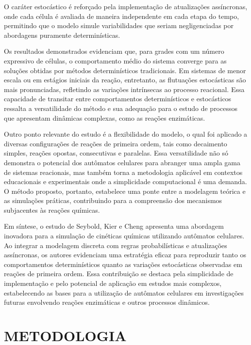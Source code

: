 \documentclass[12pt,oneside]{report}
\begin{document}
O caráter estocástico é reforçado pela implementação de atualizações assíncronas, onde cada célula é avaliada de maneira independente em cada etapa do tempo, permitindo que o modelo simule variabilidades que seriam negligenciadas por abordagens puramente determinísticas.

Os resultados demonstrados evidenciam que, para grades com um número expressivo de células, o comportamento médio do sistema converge para as soluções obtidas por métodos determinísticos tradicionais. Em sistemas de menor escala ou em estágios iniciais da reação, entretanto, as flutuações estocásticas são mais pronunciadas, refletindo as variações intrínsecas ao processo reacional. Essa capacidade de transitar entre comportamentos determinísticos e estocásticos ressalta a versatilidade do método e sua adequação para o estudo de processos que apresentam dinâmicas complexas, como as reações enzimáticas.

Outro ponto relevante do estudo é a flexibilidade do modelo, o qual foi aplicado a diversas configurações de reações de primeira ordem, tais como decaimento simples, reações opostas, consecutivas e paralelas. Essa versatilidade não só demonstra o potencial dos autômatos celulares para abranger uma ampla gama de sistemas reacionais, mas também torna a metodologia aplicável em contextos educacionais e experimentais onde a simplicidade computacional é uma demanda. O método proposto, portanto, estabelece uma ponte entre a modelagem teórica e as simulações práticas, contribuindo para a compreensão dos mecanismos subjacentes às reações químicas.

Em síntese, o estudo de Seybold, Kier e Cheng \cite{seybold1997simulation} apresenta uma abordagem inovadora para a simulação de cinéticas químicas utilizando autômatos celulares. Ao integrar a modelagem discreta com regras probabilísticas e atualizações assíncronas, os autores evidenciam uma estratégia eficaz para reproduzir tanto os comportamentos determinísticos quanto as variações estocásticas observadas em reações de primeira ordem. Essa contribuição se destaca pela simplicidade de implementação e pelo potencial de aplicação em estudos mais complexos, estabelecendo as bases para a utilização de autômatos celulares em investigações futuras envolvendo reações enzimáticas e outros processos dinâmicos.

\chapter{METODOLOGIA}
\end{document}
